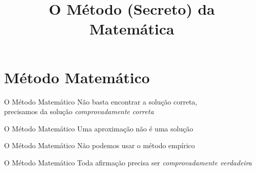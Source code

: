 
\usepackage{integracao_e_series}

\title{O Método (Secreto) da Matemática}



\addtitle

\section{Método Matemático}

\begin{frame}{O Método Matemático}
  Não basta encontrar a solução correta, \\[2mm]
  precisamos da solução \emph{comprovadamente correta}
\end{frame}

\begin{frame}{O Método Matemático}
  Uma aproximação não é uma solução
\end{frame}

\begin{frame}{O Método Matemático}
  Não podemos usar o método empírico
\end{frame}

\begin{frame}{O Método Matemático}
  Toda afirmação precisa ser \emph{comprovadamente verdadeira}
\end{frame}

